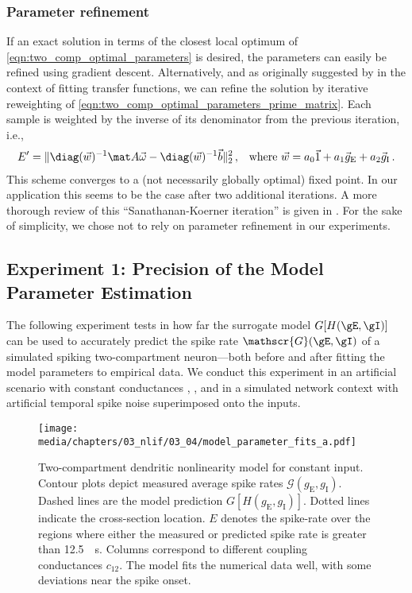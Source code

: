 \subsubsection{Parameter refinement}
If an exact solution in terms of the closest local optimum of \cref{eqn:two_comp_optimal_parameters} is desired, the parameters can easily be refined using gradient descent.
Alternatively, and as originally suggested by \citet{sanathanan1963transfer} in the context of fitting transfer functions, we can refine the solution by iterative reweighting of \cref{eqn:two_comp_optimal_parameters_prime_matrix}.
Each sample is weighted by the inverse of its denominator from the previous iteration, i.e.,
\begin{align}
	E' &= \|\diag(\vec w)^{-1} \mat A \vec \omega - \diag(\vec w)^{-1}\vec b \|_2^2 \,, & \text{where } \vec w = a_0 \vec{1} + a_1 \vec g_\mathrm{E} + a_2 \vec g_\mathrm{I} \,.
	\label{eqn:sanathanan_koerner}
\end{align}
This scheme converges to a (not necessarily globally optimal) fixed point.
In our application this seems to be the case after two additional iterations.
A more thorough review of this \enquote{Sanathanan-Koerner iteration} is given in \citet[Section~2.2]{hokanson2018least}.
For the sake of simplicity, we chose not to rely on parameter refinement in our experiments.

\subsection{Experiment 1: Precision of the Model Parameter Estimation}
\label{sec:two_comp_lif_experiment_1}

The following experiment tests in how far the surrogate model $G[H(\gE, \gI)]$ can be used to accurately predict the spike rate $\mathscr{G}(\gE, \gI)$ of a simulated spiking two-compartment \LIF neuron---both before and after fitting the model parameters to empirical data.
We conduct this experiment in an artificial scenario with constant conductances \gE, \gI, and in a simulated network context with artificial temporal spike noise superimposed onto the inputs.

\begin{figure}[t]
	\texttt{[image: media/chapters/03\_nlif/03\_04/model\_parameter\_fits\_a.pdf]}%
	{\label{fig:synaptic_nonlinearity_fit_a_a}}%
	{\label{fig:synaptic_nonlinearity_fit_a_b}}%
	\caption[Two-compartment dendritic nonlinearity model for constant input]{
		Two-compartment dendritic nonlinearity model for constant input. Contour plots depict measured average spike rates $\mathscr{G}(g_\mathrm{E}, g_\mathrm{I})$.
		Dashed lines are the model prediction $G[H(g_\mathrm{E}, g_\mathrm{I})]$. Dotted lines indicate the cross-section location.
		$E$ denotes the spike-rate \RMSE over the regions where either the measured or predicted spike rate is greater than \SI{12.5}{\per\second}.
		Columns correspond to different coupling conductances $c_\mathrm{12}$.
		The model fits the numerical data well, with some deviations near the spike onset.}
	\label{fig:synaptic_nonlinearity_fit_a}%
\end{figure}

